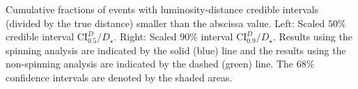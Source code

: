 \label{fig:distance} Cumulative fractions of events with luminosity-distance credible intervals (divided by the true distance) smaller than the abscissa value. Left: Scaled $50\%$ credible interval $\mathrm{CI}^{D}_{0.5}/D_\star$. Right: Scaled $90\%$ interval $\mathrm{CI}^{D}_{0.9}/D_\star$. Results using the spinning analysis are indicated by the solid (blue) line and the results using the non-spinning analysis \citep{Berry_2014} are indicated by the dashed (green) line. The $68\%$ confidence intervals are denoted by the shaded areas.